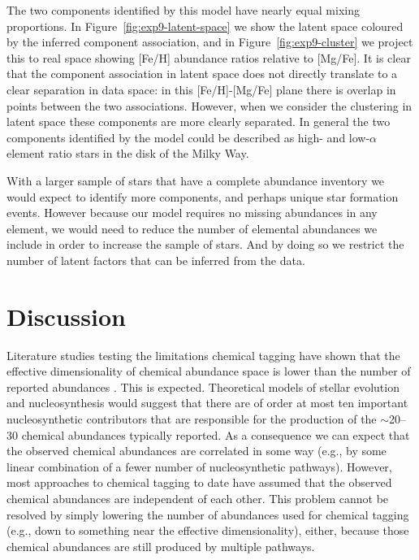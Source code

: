 \documentclass[twocolumn]{aastex62}
\begin{document}
The two components identified by this model have nearly equal mixing proportions.
In Figure~\ref{fig:exp9-latent-space} we show the latent space coloured by the
inferred component association, and in Figure~\ref{fig:exp9-cluster} we project
this to real space showing [Fe/H] abundance ratios relative to [Mg/Fe].
It is clear that the component association in latent space does not directly
translate to a clear separation in data space: in this [Fe/H]-[Mg/Fe] plane
there is overlap in points between the two associations. 
However, when we consider the clustering in latent space these components 
are more clearly separated. In general the two components identified by the
model could be described as high- and low-$\alpha$ element ratio stars in
the disk of the Milky Way.

With a larger sample of stars that have a complete abundance inventory we would expect to 
identify more components, and perhaps unique star formation events. However
because our model requires no missing abundances in any element, we would
need to reduce the number of elemental abundances we include in order to increase
the sample of stars. And by doing so we restrict the number of latent factors
that can be inferred from the data.


\section{Discussion} \label{sec:discussion}

Literature studies testing the limitations chemical tagging have shown
that the effective dimensionality of chemical abundance space is lower than
the number of reported abundances \citep[e.g.,][]{Price-Jones:2018}. 
This is expected. Theoretical models of stellar evolution and nucleosynthesis
would suggest that there are of order at most ten important nucleosynthetic 
contributors that are responsible for the production of the $\sim$20--30
chemical abundances typically reported. As a consequence we can expect that 
the observed chemical abundances are correlated in some way (e.g., by some
linear combination of a fewer number of nucleosynthetic pathways).  However, 
most approaches to chemical tagging to date have assumed that the observed 
chemical abundances are independent of each other. This problem cannot be
resolved by simply lowering the number of abundances used for chemical tagging (e.g.,
down to something near the effective dimensionality), either, because those
chemical abundances are still produced by multiple pathways.
\end{document}
